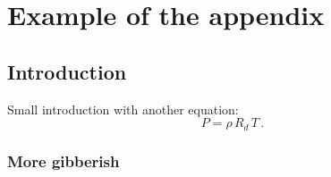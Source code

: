 
\chapter{Example of the appendix}
\label{apdx:a}

\section{Introduction}
\label{sec:apdx:a:intro}

Small introduction with another equation:
\begin{equation}
P=\rho\,R_d\,T
\,.
\label{eq:state}
\end{equation}

\subsection{More gibberish}

\blindtext
\blinditemize
\blindtext
\blindenumerate
\blindtext
\blinddescription
\Blindtext



